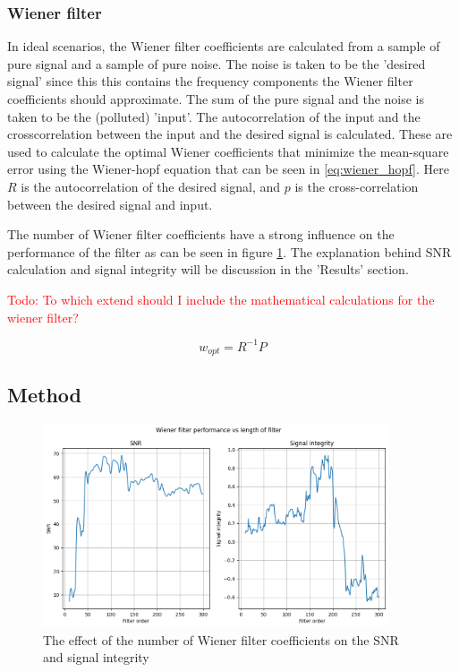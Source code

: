 \subsubsection{Wiener filter}
In ideal scenarios, the Wiener filter coefficients are calculated from a sample of pure signal and a sample of pure noise. The noise is taken to be the 'desired signal' since this this contains the frequency components the Wiener filter coefficients should approximate. The sum of the pure signal and the noise is taken to be the (polluted) 'input'.
The autocorrelation of the input and the crosscorrelation between the input and the desired signal is calculated. These are used to calculate the optimal Wiener coefficients that minimize the mean-square error using the Wiener-hopf equation that can be seen in \ref{eq:wiener_hopf}. Here $R$ is the autocorrelation of the desired signal, and $p$ is the cross-correlation between the desired signal and input. 

The number of Wiener filter coefficients have a strong influence on the performance of the filter as can be seen in figure \ref{fig:wiener_filter_length}. The explanation behind SNR calculation and signal integrity will be discussion in the 'Results' section.

\textcolor{red}{Todo: To which extend should I include the mathematical calculations for the wiener filter?}

\begin{equation}
    w_{opt} = R^{-1}P
    \label{eq:wiener_hopf}
\end{equation}

\subsection{Method}
\begin{figure}[h!t]
	\begin{center}
		\includegraphics[height=60mm]{images/wiener_filter_length.png}
	\end{center}
	\caption{The effect of the number of Wiener filter coefficients on the SNR and signal integrity}
	\label{fig:wiener_filter_length}
\end{figure}


